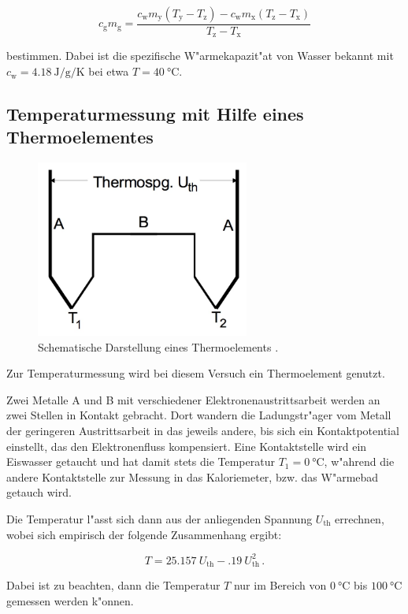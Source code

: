 		\begin{equation}
			c_\mathrm{g}m_\mathrm{g} = \frac{c_\mathrm{w}m_\mathrm{y}\left( T_\mathrm{y} - T_\mathrm{z}\right) - c_\mathrm{w}m_\mathrm{x} \left( T_\mathrm{z} - T_\mathrm{x} \right) }{T_\mathrm{z} - T_\mathrm{x}} \label{cg}
		\end{equation}

		bestimmen. Dabei ist die spezifische W"armekapazit"at von Wasser bekannt mit $c_\mathrm{w} = \SI{4.18}{\joule \per \gram \per \kelvin}$ \cite{anleitung} bei etwa $T = \SI{40}{\celsius}$.

	\subsection{Temperaturmessung mit Hilfe eines Thermoelementes}
	\label{subsec:thermoelement}
		\begin{figure}
			\centering
			\includegraphics[width = 7cm]{img/thermoelement.jpg}
			\caption{Schematische Darstellung eines Thermoelements \cite{anleitung}.}
			\label{fig:thermoelement}
		\end{figure}

		Zur Temperaturmessung wird bei diesem Versuch ein Thermoelement genutzt.

		Zwei Metalle A und B mit verschiedener Elektronenaustrittsarbeit werden an zwei Stellen in Kontakt gebracht.
		Dort wandern die Ladungstr"ager vom Metall der geringeren Austrittsarbeit in das jeweils andere, bis sich ein Kontaktpotential einstellt, das den Elektronenfluss kompensiert.
		Eine Kontaktstelle wird ein Eiswasser getaucht und hat damit stets die Temperatur $T_1 = \SI{0}{\celsius}$, w"ahrend die andere Kontaktstelle zur Messung in das Kaloriemeter, bzw. das W"armebad getauch wird.

		Die Temperatur l"asst sich dann aus der anliegenden Spannung $U_\mathrm{th}$ errechnen, wobei sich empirisch der folgende Zusammenhang ergibt:

		\begin{equation}
			T = \SI{25.157}{} U_\mathrm{th} - \SI{.19}{} U_\mathrm{th}^2 \,. \label{T}
		\end{equation}

		Dabei ist zu beachten, dann die Temperatur $T$ nur im Bereich von $\SI{0}{\celsius}$ bis $\SI{100}{\celsius}$ gemessen werden k"onnen.

		\clearpage